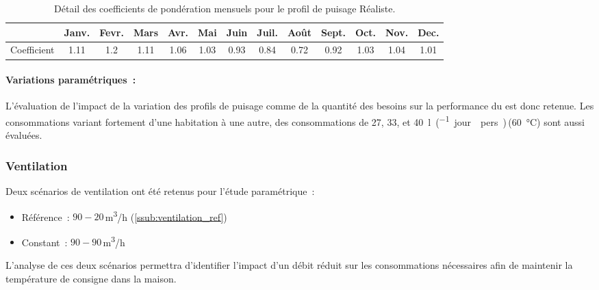 \begin{table}
\centering
\caption{Détail des coefficients de pondération mensuels pour le profil de
         puisage Réaliste.}
\label{tab:coef_mois}
\begin{tabular}{l*{12}{c}}
    \toprule
                & Janv. & Fevr. & Mars & Avr. & Mai & Juin & Juil. & Août & Sept. & Oct. & Nov. & Dec. \\
    \midrule
    Coefficient & \num{1.11}   & \num{1.2}   & \num{1.11}  & \num{1.06}  & \num{1.03}  & \num{0.93}   & \num{0.84}    & \num{0.72}   & \num{0.92}    & \num{1.03}  & \num{1.04}  & \num{1.01}  \\
    \bottomrule
\end{tabular}
\end{table}

\paragraph{Variations paramétriques~:} %
\label{par:variations_parametriques}
L’évaluation de l’impact de la variation des profils de puisage comme de la quantité des
besoins sur la performance du  est donc retenue. Les consommations variant fortement
d’une habitation à une autre, des consommations de \num{27}, \num{33}, et
\SI{40}{\litre\per(jour \period  pers)}\,(\SI{60}{\celsius}) sont aussi évaluées.


\subsubsection{Ventilation} %
\label{ssub:ventilation}
Deux scénarios de ventilation ont été retenus pour l’étude paramétrique~:
\begin{itemize}
    \item Référence~: $90-20$\,\si[per-mode=symbol]{\meter\cubed\per\hour} (\ref{ssub:ventilation_ref})
    \item Constant~: $90-90$\,\si[per-mode=symbol]{\meter\cubed\per\hour}
\end{itemize}
L’analyse de ces deux scénarios permettra d’identifier l’impact d’un débit réduit sur
les consommations nécessaires afin de maintenir la température de consigne dans la
maison.


